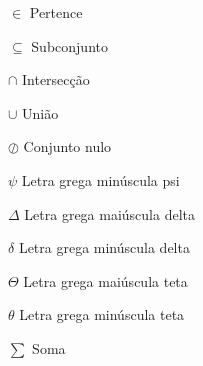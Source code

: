 \begin{simbolos}
  \item[$ \in $] Pertence
  \item[$ \subseteq $] Subconjunto
  \item[$ \cap $] Intersecção
  \item[$ \cup $] União
  \item[$ \oslash $] Conjunto nulo
  \item[$ \psi $] Letra grega minúscula psi
  \item[$ \Delta $] Letra grega maiúscula delta
  \item[$ \delta $] Letra grega minúscula delta
  \item[$ \Theta $] Letra grega maiúscula teta
  \item[$ \theta $] Letra grega minúscula teta
  \item[$ \sum $] Soma
\end{simbolos}
